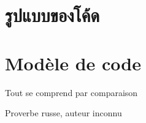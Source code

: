 \ifdefined\THAI
\chapter{รูปแบบของโค้ด}
\fi %

\ifdefined\FRENCH
\chapter{Modèle de code}
\epigraph{Tout se comprend par comparaison}{Proverbe russe, auteur inconnu}
\fi %

\EN{}
\ES{}
\ITA{}
\PTBR{}
\RU{}
\THA{}
\DE{}
\FR{}

\ES{\ESph{}}
\PTBR{\PTBRph{}}
\THA{\THAph{}}

\EN{}
\ES{}
\ITA{}
\PTBR{}
\RU{}
\DE{}
\FR{}

\EN{}
\ITA{}
\DE{}
\FR{}

